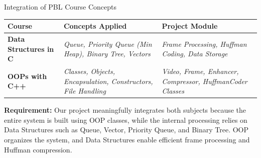 \documentclass[aspectratio=169,11pt]{beamer}
\newcommand{\placeholder}[1]{\textit{\color{GEUGrey}#1}}
\begin{document}
\begin{frame}{Integration of PBL Course Concepts}
\begin{center}
\scriptsize
\renewcommand{\arraystretch}{1.20}
\begin{tabularx}{.94\textwidth}{@{}>{\bfseries}p{2.45cm}>{\RaggedRight\arraybackslash}X>{\RaggedRight\arraybackslash}p{3.05cm}@{}}
\toprule
Course & Concepts Applied & Project Module\\
\midrule
Data Structures in C &
\placeholder{Queue, Priority Queue (Min Heap), Binary Tree, Vectors} &
\placeholder{Frame Processing, Huffman Coding, Data Storage}\\[1mm]
OOPs with C++ &
\placeholder{Classes, Objects, Encapsulation, Constructors, File Handling} &
\placeholder{Video, Frame, Enhancer, Compressor, HuffmanCoder Classes}\\
\bottomrule
\end{tabularx}
\end{center}
\vspace{2mm}
\begin{center}
\colorbox{GEULightBlue}{\parbox{.88\textwidth}{\small
\textbf{Requirement:}
Our project meaningfully integrates both subjects because the entire system is built using OOP classes, while the internal processing relies on Data Structures such as Queue, Vector, Priority Queue, and Binary Tree. OOP organizes the system, and Data Structures enable efficient frame processing and Huffman compression.}}
\end{center}
\end{frame}
\end{document}

